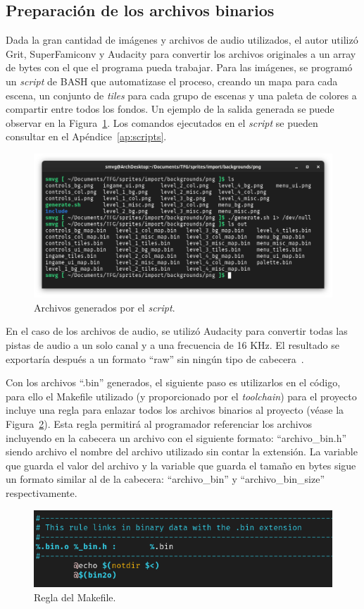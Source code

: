 \subsection{Preparación de los archivos binarios}
Dada la gran cantidad de imágenes y archivos de audio utilizados, el autor utilizó Grit, SuperFamiconv y Audacity para convertir los archivos originales a un array de bytes con el que el programa pueda trabajar. Para las imágenes, se programó un \textit{script} de BASH que automatizase el proceso, creando un mapa para cada escena, un conjunto de \textit{tiles} para cada grupo de escenas y una paleta de colores a compartir entre todos los fondos. Un ejemplo de la salida generada se puede observar en la Figura~\ref{fig:script}. Los comandos ejecutados en el \textit{script} se pueden consultar en el Apéndice~\ref{ap:scripts}.

\begin{figure}[h]
	\centering
	\includegraphics[width=.8\textwidth]{capitulos/capitulo5/salida_script.png}
	\caption{Archivos generados por el \textit{script}.}\label{fig:script}
\end{figure}
\FloatBarrier{}

En el caso de los archivos de audio, se utilizó Audacity para convertir todas las pistas de audio a un solo canal y a una frecuencia de 16 KHz. El resultado se exportaría después a un formato ``raw'' sin ningún tipo de cabecera~\cite{bib:washington}.

Con los archivos ``.bin'' generados, el siguiente paso es utilizarlos en el código, para ello el Makefile utilizado (y proporcionado por el \textit{toolchain}) para el proyecto incluye una regla para enlazar todos los archivos binarios al proyecto (véase la Figura~\ref{fig:makefile}). Esta regla permitirá al programador referenciar los archivos incluyendo en la cabecera un archivo con el siguiente formato: ``archivo\_bin.h'' siendo archivo el nombre del archivo utilizado sin contar la extensión. La variable que guarda el valor del archivo y la variable que guarda el tamaño en bytes sigue un formato similar al de la cabecera: ``archivo\_bin'' y ``archivo\_bin\_size'' respectivamente.

\begin{figure}[h]
	\centering
	\includegraphics[width=.7\textwidth]{capitulos/capitulo5/makefile.png}
	\caption{Regla del Makefile.}\label{fig:makefile}
\end{figure}
\FloatBarrier{}
